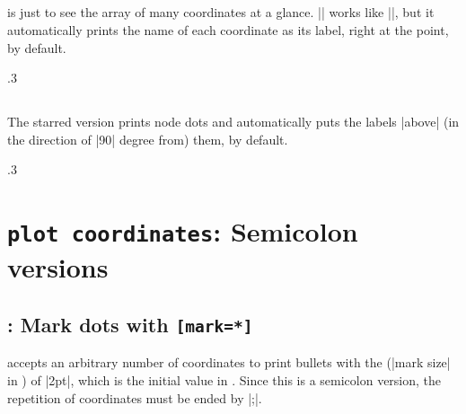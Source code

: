\subsection{\protect\cmd{\tzcoorsquick}}
\label{ssi:tzcoorsquick}

\icmd{\tzcoorsquick} is just to see the array of many coordinates at a glance.
|\tzcoorsquick| works like |\tzcoors|, but it automatically prints the name of each coordinate as its label, right at the point, by default.

\begin{tzcode}{.3}
\end{tzcode}

\subsection{\protect\cmd{\tzcoorsquick*}}
\label{ssi:tzcoorsquick*}

The starred version \icmd{\tzcoorsquick*} prints node dots and automatically puts the labels |above| (in the direction of |90| degree from) them, by default.

\begin{tzcode}{.3}
\end{tzcode}


\section{\texttt{plot coordinates}: Semicolon versions}
\label{si:plotcoordinates}

\subsection{\protect\cmd{\tzplot*}: Mark dots with \texttt{[mark=*]}}
\label{ssi:tzplot*}

\icmd{\tzplot*} accepts an arbitrary number of coordinates to print bullets with the  (|mark size| in \Tikz) of |2pt|, which is the initial value in \Tikz. Since this is a semicolon version, the repetition of coordinates must be ended by |;|.

